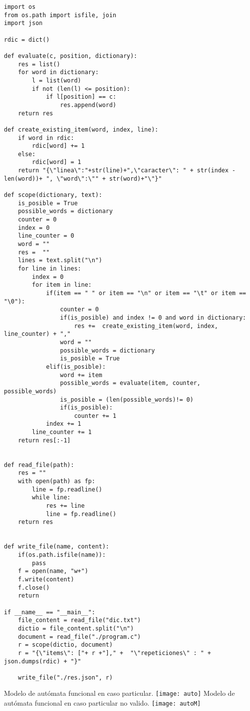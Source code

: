 \documentclass[a4paper]{article}
\begin{document}
            \begin{lstlisting}
import os
from os.path import isfile, join
import json 

rdic = dict()

def evaluate(c, position, dictionary):
    res = list()
    for word in dictionary:
        l = list(word)
        if not (len(l) <= position):
            if l[position] == c:
                res.append(word)
    return res

def create_existing_item(word, index, line):
    if word in rdic:
        rdic[word] += 1
    else: 
        rdic[word] = 1
    return "{\"linea\":"+str(line)+",\"caracter\": " + str(index -  len(word))+ ", \"word\":\"" + str(word)+"\"}"

def scope(dictionary, text):
    is_posible = True
    possible_words = dictionary
    counter = 0
    index = 0
    line_counter = 0
    word = ""
    res =  ""
    lines = text.split("\n")
    for line in lines:
        index = 0
        for item in line:
            if(item == " " or item == "\n" or item == "\t" or item == "\0"):
                counter = 0
                if(is_posible) and index != 0 and word in dictionary:
                    res +=  create_existing_item(word, index, line_counter) + ","
                word = ""
                possible_words = dictionary
                is_posible = True
            elif(is_posible):
                word += item
                possible_words = evaluate(item, counter, possible_words)
                is_posible = (len(possible_words)!= 0)
                if(is_posible):
                    counter += 1 
            index += 1
        line_counter += 1
    return res[:-1]


def read_file(path):
    res = ""
    with open(path) as fp:
        line = fp.readline()
        while line:
            res += line
            line = fp.readline()
    return res


def write_file(name, content):
    if(os.path.isfile(name)):
        pass
    f = open(name, "w+")
    f.write(content)
    f.close()
    return

if __name__ == "__main__":
    file_content = read_file("dic.txt")
    dictio = file_content.split("\n")
    document = read_file("./program.c")
    r = scope(dictio, document)
    r = "{\"items\": ["+ r +"]," +  "\"repeticiones\" : " + json.dumps(rdic) + "}"

    write_file("./res.json", r)                
            \end{lstlisting}
            Modelo de autómata funcional en caso particular.\newline
            \texttt{[image: auto]}
            Modelo de autómata funcional en caso particular no valido.\newline
            \texttt{[image: autoM]}
\end{document}
